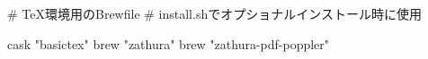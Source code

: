 # TeX環境用のBrewfile
# install.shでオプショナルインストール時に使用

cask "basictex"
brew "zathura"
brew "zathura-pdf-poppler"